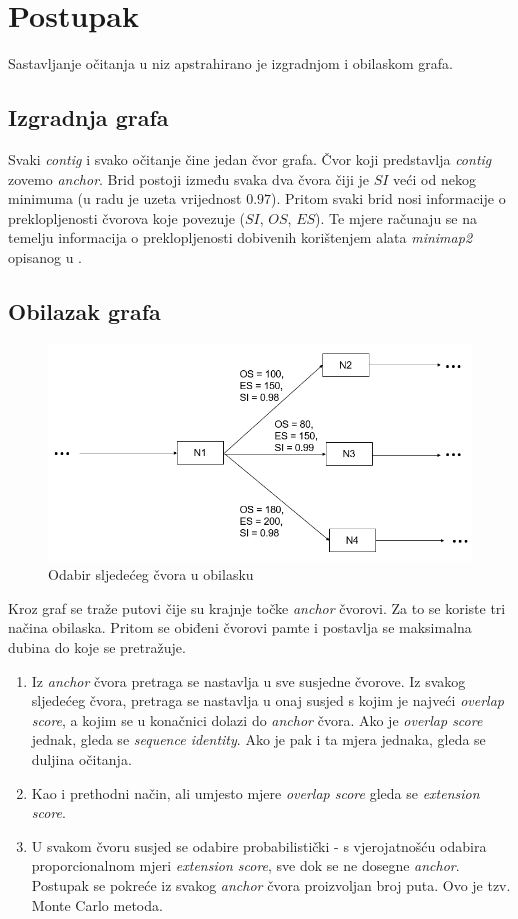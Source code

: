 \documentclass[times, utf8, seminar, numeric]{fer}
\begin{document}
\chapter{Postupak}
Sastavljanje očitanja u niz apstrahirano je izgradnjom i obilaskom grafa.
\section{Izgradnja grafa}
Svaki \textit{contig} i svako očitanje čine jedan čvor grafa. Čvor koji predstavlja \textit{contig} zovemo \textit{anchor}. Brid postoji između svaka dva čvora čiji je $SI$ veći od nekog minimuma (u radu je uzeta vrijednost $0.97$). Pritom svaki brid nosi informacije o preklopljenosti čvorova koje povezuje ($SI$, $OS$, $ES$). Te mjere računaju se na temelju informacija o preklopljenosti dobivenih korištenjem alata \textit{minimap2} opisanog u \cite{minimap2}.

\section{Obilazak grafa}

\begin{figure}[h]
	\centering
	\includegraphics[width=0.7\linewidth]{img/traversal}
	\caption{Odabir sljedećeg čvora u obilasku}
	\label{fig:traversal}
\end{figure}


Kroz graf se traže putovi čije su krajnje točke \textit{anchor} čvorovi. Za to se koriste tri načina obilaska. Pritom se obiđeni čvorovi pamte i postavlja se maksimalna dubina do koje se pretražuje.
\begin{enumerate}
	\item Iz \textit{anchor} čvora pretraga se nastavlja u sve susjedne čvorove. Iz svakog sljedećeg čvora, pretraga se nastavlja u onaj susjed s kojim je najveći \textit{overlap score}, a kojim se u konačnici dolazi do \textit{anchor} čvora. Ako je \textit{overlap score} jednak, gleda se \textit{sequence identity}. Ako je pak i ta mjera jednaka, gleda se duljina očitanja.
	\item Kao i prethodni način, ali umjesto mjere \textit{overlap score} gleda se \textit{extension score}.
	\item U svakom čvoru susjed se odabire probabilistički - s vjerojatnošću odabira proporcionalnom mjeri \textit{extension score}, sve dok se ne dosegne \textit{anchor}. Postupak se pokreće iz svakog \textit{anchor} čvora proizvoljan broj puta. Ovo je tzv. Monte Carlo metoda.
\end{enumerate}
\end{document}
